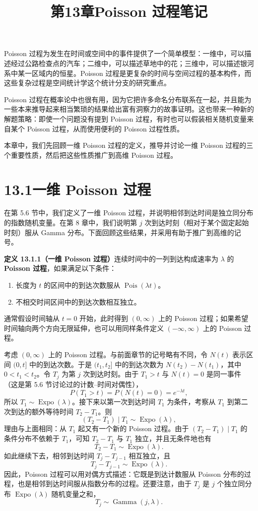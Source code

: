 \documentclass[UTF8,12pt,a4paper,fontset=fandol]{ctexart}
\title{第13章\quad Poisson 过程笔记}
\author{}
\date{}
\begin{document}
\maketitle

Poisson 过程为发生在时间或空间中的事件提供了一个简单模型：一维中，可以描述经过公路检查点的汽车；二维中，可以描述草地中的花；三维中，可以描述银河系中某一区域内的恒星。Poisson 过程是更复杂的时间与空间过程的基本构件，而这些复杂过程是空间统计学这个统计分支的研究重点。

Poisson 过程在概率论中也很有用，因为它把许多命名分布联系在一起，并且能为一些本来推导起来相当繁琐的结果给出富有洞察力的故事证明。这也带来一种新的解题策略：即使一个问题没有提到 Poisson 过程，有时也可以假装相关随机变量来自某个 Poisson 过程，从而使用便利的 Poisson 过程性质。

本章中，我们先回顾一维 Poisson 过程的定义，推导并讨论一维 Poisson 过程的三个重要性质，然后把这些性质推广到高维 Poisson 过程。

\section*{13.1\quad 一维 Poisson 过程}

在第 5.6 节中，我们定义了一维 Poisson 过程，并说明相邻到达时间是独立同分布的指数随机变量。在第 8 章中，我们说明第 $j$ 次到达时刻（相对于某个固定起始时刻）服从 Gamma 分布。下面回顾这些结果，并采用有助于推广到高维的记号。

\noindent\textbf{定义 13.1.1（一维 Poisson 过程）}\quad 连续时间中的一列到达构成速率为 $\lambda$ 的 \textbf{Poisson 过程}，如果满足以下条件：
\begin{enumerate}
  \item 长度为 $t$ 的区间中的到达次数服从 $\operatorname{Pois}(\lambda t)$。
  \item 不相交时间区间中的到达次数相互独立。
\end{enumerate}

通常假设时间轴从 $t=0$ 开始，此时得到 $(0,\infty)$ 上的 Poisson 过程；如果希望时间轴向两个方向无限延伸，也可以用同样条件定义 $(-\infty,\infty)$ 上的 Poisson 过程。

考虑 $(0,\infty)$ 上的 Poisson 过程。与前面章节的记号略有不同，令 $N(t)$ 表示区间 $(0,t]$ 中的到达次数。于是 $(t_1,t_2]$ 中的到达次数为 $N(t_2)-N(t_1)$，其中 $0<t_1<t_2$。令 $T_j$ 为第 $j$ 次到达时刻。由于 $T_1>t$ 与 $N(t)=0$ 是同一事件（这是第 5.6 节讨论过的计数--时间对偶性），
\[
  P(T_1>t)=P(N(t)=0)=e^{-\lambda t},
\]
所以 $T_1\sim\operatorname{Expo}(\lambda)$。接下来以第一次到达时间 $T_1$ 为条件，考察从 $T_1$ 到第二次到达的额外等待时间 $T_2-T_1$。则
\[
  (T_2-T_1)\mid T_1 \sim \operatorname{Expo}(\lambda),
\]
理由与上面相同：从 $T_1$ 起又有一个新的 Poisson 过程。由于 $(T_2-T_1)\mid T_1$ 的条件分布不依赖于 $T_1$，可知 $T_2-T_1$ 与 $T_1$ 独立，并且无条件地也有
\[
  T_2-T_1\sim\operatorname{Expo}(\lambda).
\]
如此继续下去，相邻到达时间 $T_j-T_{j-1}$ 相互独立，且
\[
  T_j-T_{j-1}\sim\operatorname{Expo}(\lambda).
\]
因此，Poisson 过程可以用对偶方式描述：它既是到达计数服从 Poisson 分布的过程，也是相邻到达时间服从指数分布的过程。还要注意，由于 $T_j$ 是 $j$ 个独立同分布 $\operatorname{Expo}(\lambda)$ 随机变量之和，
\[
  T_j\sim\operatorname{Gamma}(j,\lambda).
\]
\end{document}
